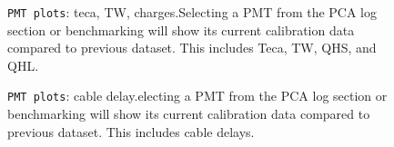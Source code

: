 \documentclass[12pt]{article}
\begin{document}
\begin{figure}
\centering
\noindent{}
  \caption{\centering \texttt{PMT plots}: teca, TW, charges.\hspace{\textwidth}Selecting a PMT from the PCA log section or benchmarking will show its current calibration data compared to previous dataset. This includes Teca, TW, QHS, and QHL.}
  \label{fig:pmt1}
\end{figure}

\begin{figure}
\centering
\noindent{}
  \caption{\centering \texttt{PMT plots}: cable delay.\hspace{\textwidth}electing a PMT from the PCA log section or benchmarking will show its current calibration data compared to previous dataset. This includes cable delays.}
  \label{fig:pmt2}
\end{figure}
\end{document}
